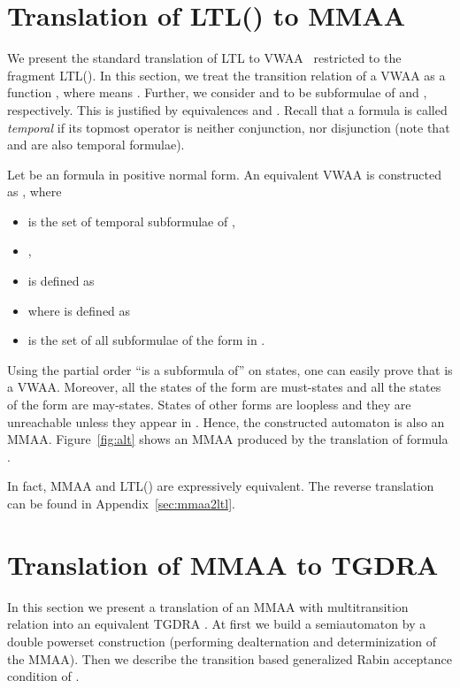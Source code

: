 \documentclass{llncs}
\begin{document}
\section{Translation of LTL() to MMAA}\label{sec:corr}

We present the standard translation of LTL to VWAA~\cite{GO01} restricted to
the fragment LTL().  In this section, we treat the transition
relation  of a VWAA as a function
, where  means
.  Further, we consider  and  to be
subformulae of  and , respectively.  This is justified by
equivalences  and .  Recall
that a formula is called \emph{temporal} if its topmost operator is neither
conjunction, nor disjunction (note that  and  are also temporal
formulae).

Let  be an  formula in positive normal form.  An
equivalent VWAA is constructed as , where
\begin{itemize}
\item  is the set of temporal subformulae of ,
\item ,
\item  is defined as 
  
  
\item  where  is defined
  as 
  
\item  is the set of all subformulae of the form  in .
\end{itemize}

Using the partial order ``is a subformula of'' on states, one can easily
prove that  is a VWAA.  Moreover, all the states of the form
 are must-states and all the states of the form  are may-states.
States of other forms are loopless and they are unreachable unless they
appear in . Hence, the constructed automaton is also an MMAA.
Figure~\ref{fig:alt} shows an MMAA produced by the translation of formula
.



In fact, MMAA and LTL() are expressively equivalent.  The reverse
translation can be found in Appendix~\ref{sec:mmaa2ltl}.



\section{Translation of MMAA to TGDRA}
\label{sec:MMAA2DRA}
In this section we present a translation of an MMAA  with multitransition relation  into an
equivalent TGDRA . At first we build a semiautomaton  by a double
powerset construction (performing dealternation and determinization of the
MMAA). Then we describe the transition based generalized Rabin acceptance
condition  of .
\end{document}
